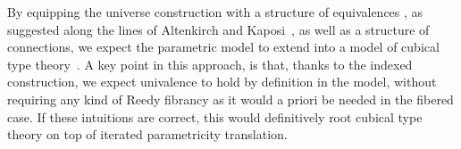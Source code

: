 \documentclass[10pt]{art.cls/art}
\begin{document}
By equipping the universe construction with a structure of equivalences , as suggested along the lines of Altenkirch and Kaposi~\cite{altenkirch15}, as well as a structure of connections, we expect the parametric model to extend into a model of cubical type theory~\cite{bezem13}. A key point in this approach, is that, thanks to the indexed construction, we expect univalence to hold by definition in the model, without requiring any kind of Reedy fibrancy as it would a priori be needed in the fibered case. If these intuitions are correct, this would definitively root cubical type theory on top of iterated parametricity translation.



\end{document}
